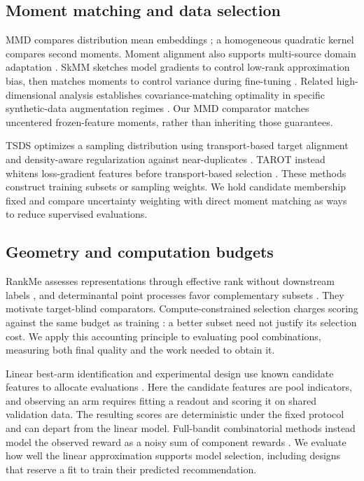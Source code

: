 \subsection{Moment matching and data selection}
MMD compares distribution mean embeddings \citep{gretton2012}; a homogeneous quadratic kernel compares second moments. Moment alignment also supports multi-source domain adaptation \citep{peng2019}. SkMM sketches model gradients to control low-rank approximation bias, then matches moments to control variance during fine-tuning \citep{dong2024skmm}. Related high-dimensional analysis establishes covariance-matching optimality in specific synthetic-data augmentation regimes \citep{rezaei2026synthetic}. Our MMD comparator matches uncentered frozen-feature moments, rather than inheriting those guarantees.

TSDS optimizes a sampling distribution using transport-based target alignment and density-aware regularization against near-duplicates \citep{liu2024tsds}. TAROT instead whitens loss-gradient features before transport-based selection \citep{feng2025tarot}. These methods construct training subsets or sampling weights. We hold candidate membership fixed and compare uncertainty weighting with direct moment matching as ways to reduce supervised evaluations.

\subsection{Geometry and computation budgets}
RankMe assesses representations through effective rank without downstream labels \citep{garrido2023rankme}, and determinantal point processes favor complementary subsets \citep{kulesza2012}. They motivate target-blind comparators. Compute-constrained selection charges scoring against the same budget as training \citep{yin2025}: a better subset need not justify its selection cost. We apply this accounting principle to evaluating pool combinations, measuring both final quality and the work needed to obtain it.

Linear best-arm identification and experimental design use known candidate features to allocate evaluations \citep{soare2014linbai,fiez2019transductive,xu2018lingape,yangtan2022linbai}. Here the candidate features are pool indicators, and observing an arm requires fitting a readout and scoring it on shared validation data. The resulting scores are deterministic under the fixed protocol and can depart from the linear model. Full-bandit combinatorial methods instead model the observed reward as a noisy sum of component rewards \citep{rejwan2020full}. We evaluate how well the linear approximation supports model selection, including designs that reserve a fit to train their predicted recommendation.

